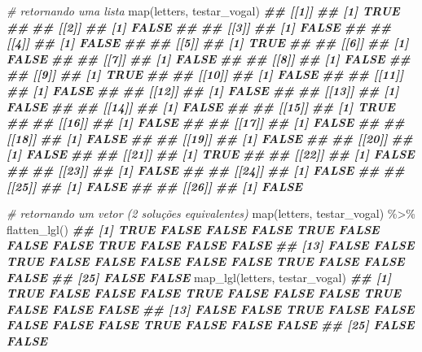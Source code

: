 \documentclass[
]{book}
\newenvironment{Shaded}{\begin{snugshade}}{\end{snugshade}}
\newcommand{\CommentTok}[1]{\textcolor[rgb]{0.56,0.35,0.01}{\textit{#1}}}
\newcommand{\DocumentationTok}[1]{\textcolor[rgb]{0.56,0.35,0.01}{\textbf{\textit{#1}}}}
\newcommand{\FunctionTok}[1]{\textcolor[rgb]{0.00,0.00,0.00}{#1}}
\newcommand{\NormalTok}[1]{#1}
\newcommand{\SpecialCharTok}[1]{\textcolor[rgb]{0.00,0.00,0.00}{#1}}
\begin{document}
\begin{Shaded}
\begin{Highlighting}[]
\CommentTok{\# retornando uma lista}
\FunctionTok{map}\NormalTok{(letters, testar\_vogal)}
\DocumentationTok{\#\# [[1]]}
\DocumentationTok{\#\# [1] TRUE}
\DocumentationTok{\#\# }
\DocumentationTok{\#\# [[2]]}
\DocumentationTok{\#\# [1] FALSE}
\DocumentationTok{\#\# }
\DocumentationTok{\#\# [[3]]}
\DocumentationTok{\#\# [1] FALSE}
\DocumentationTok{\#\# }
\DocumentationTok{\#\# [[4]]}
\DocumentationTok{\#\# [1] FALSE}
\DocumentationTok{\#\# }
\DocumentationTok{\#\# [[5]]}
\DocumentationTok{\#\# [1] TRUE}
\DocumentationTok{\#\# }
\DocumentationTok{\#\# [[6]]}
\DocumentationTok{\#\# [1] FALSE}
\DocumentationTok{\#\# }
\DocumentationTok{\#\# [[7]]}
\DocumentationTok{\#\# [1] FALSE}
\DocumentationTok{\#\# }
\DocumentationTok{\#\# [[8]]}
\DocumentationTok{\#\# [1] FALSE}
\DocumentationTok{\#\# }
\DocumentationTok{\#\# [[9]]}
\DocumentationTok{\#\# [1] TRUE}
\DocumentationTok{\#\# }
\DocumentationTok{\#\# [[10]]}
\DocumentationTok{\#\# [1] FALSE}
\DocumentationTok{\#\# }
\DocumentationTok{\#\# [[11]]}
\DocumentationTok{\#\# [1] FALSE}
\DocumentationTok{\#\# }
\DocumentationTok{\#\# [[12]]}
\DocumentationTok{\#\# [1] FALSE}
\DocumentationTok{\#\# }
\DocumentationTok{\#\# [[13]]}
\DocumentationTok{\#\# [1] FALSE}
\DocumentationTok{\#\# }
\DocumentationTok{\#\# [[14]]}
\DocumentationTok{\#\# [1] FALSE}
\DocumentationTok{\#\# }
\DocumentationTok{\#\# [[15]]}
\DocumentationTok{\#\# [1] TRUE}
\DocumentationTok{\#\# }
\DocumentationTok{\#\# [[16]]}
\DocumentationTok{\#\# [1] FALSE}
\DocumentationTok{\#\# }
\DocumentationTok{\#\# [[17]]}
\DocumentationTok{\#\# [1] FALSE}
\DocumentationTok{\#\# }
\DocumentationTok{\#\# [[18]]}
\DocumentationTok{\#\# [1] FALSE}
\DocumentationTok{\#\# }
\DocumentationTok{\#\# [[19]]}
\DocumentationTok{\#\# [1] FALSE}
\DocumentationTok{\#\# }
\DocumentationTok{\#\# [[20]]}
\DocumentationTok{\#\# [1] FALSE}
\DocumentationTok{\#\# }
\DocumentationTok{\#\# [[21]]}
\DocumentationTok{\#\# [1] TRUE}
\DocumentationTok{\#\# }
\DocumentationTok{\#\# [[22]]}
\DocumentationTok{\#\# [1] FALSE}
\DocumentationTok{\#\# }
\DocumentationTok{\#\# [[23]]}
\DocumentationTok{\#\# [1] FALSE}
\DocumentationTok{\#\# }
\DocumentationTok{\#\# [[24]]}
\DocumentationTok{\#\# [1] FALSE}
\DocumentationTok{\#\# }
\DocumentationTok{\#\# [[25]]}
\DocumentationTok{\#\# [1] FALSE}
\DocumentationTok{\#\# }
\DocumentationTok{\#\# [[26]]}
\DocumentationTok{\#\# [1] FALSE}

\CommentTok{\# retornando um vetor (2 soluções equivalentes)}
\FunctionTok{map}\NormalTok{(letters, testar\_vogal) }\SpecialCharTok{\%\textgreater{}\%} \FunctionTok{flatten\_lgl}\NormalTok{()}
\DocumentationTok{\#\#  [1]  TRUE FALSE FALSE FALSE  TRUE FALSE FALSE FALSE  TRUE FALSE FALSE FALSE}
\DocumentationTok{\#\# [13] FALSE FALSE  TRUE FALSE FALSE FALSE FALSE FALSE  TRUE FALSE FALSE FALSE}
\DocumentationTok{\#\# [25] FALSE FALSE}
\FunctionTok{map\_lgl}\NormalTok{(letters, testar\_vogal)}
\DocumentationTok{\#\#  [1]  TRUE FALSE FALSE FALSE  TRUE FALSE FALSE FALSE  TRUE FALSE FALSE FALSE}
\DocumentationTok{\#\# [13] FALSE FALSE  TRUE FALSE FALSE FALSE FALSE FALSE  TRUE FALSE FALSE FALSE}
\DocumentationTok{\#\# [25] FALSE FALSE}
\end{Highlighting}
\end{Shaded}
\end{document}
